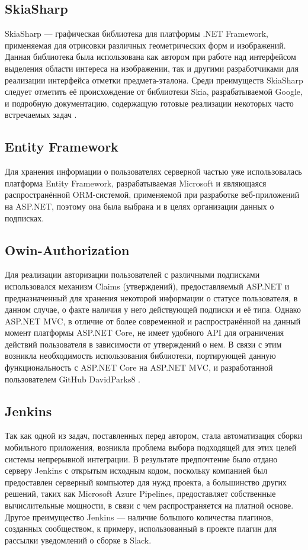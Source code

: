 \documentclass[14pt]{matmex-diploma-custom}
\begin{document}
 \subsection*{SkiaSharp}

SkiaSharp --- графическая библиотека для платформы .NET Framework, применяемая для отрисовки различных геометрических форм и изображений. Данная библиотека была использована как автором при работе над интерфейсом выделения области интереса на изображении, так и другими разработчиками для реализации интерфейса отметки предмета-эталона. Среди преимуществ SkiaSharp следует отметить её происхождение от библиотеки Skia, разрабатываемой Google, и подробную документацию, содержащую готовые реализации некоторых часто встречаемых задач \cite{skia}.

\subsection*{Entity Framework}

Для хранения информации о пользователях серверной частью уже использовалась платформа Entity Framework, разрабатываемая Microsoft и являющаяся распространённой ORM-системой, применяемой при разработке веб-приложений на ASP.NET, поэтому она была выбрана и в целях организации данных о подписках. 

\subsection*{Owin-Authorization}

Для реализации авторизации пользователей с различными подписками использовался механизм Claims (утверждений), предоставляемый ASP.NET и предназначенный для хранения некоторой информации о статусе пользователя, в данном случае, о факте наличия у него действующей подписки и её типа. Однако ASP.NET MVC, в отличие от более современной и распространённой на данный момент платформы ASP.NET Core, не имеет удобного API для ограничения действий пользователя в зависимости от утверждений о нем. В связи с этим возникла необходимость использования библиотеки, портирующей данную функциональность с ASP.NET Core на ASP.NET MVC, и разработанной пользователем GitHub DavidParks8 \cite{auth}.

\subsection*{Jenkins}

Так как одной из задач, поставленных перед автором, стала автоматизация сборки мобильного приложения, возникла проблема выбора подходящей для этих целей системы непрерывной интеграции. В результате предпочтение было отдано серверу Jenkins с открытым исходным кодом, поскольку компанией был предоставлен серверный компьютер для нужд проекта, а большинство других решений, таких как Microsoft Azure Pipelines, предоставляет собственные вычислительные мощности, в связи с чем распространяется на платной основе. Другое преимущество Jenkins --- наличие большого количества плагинов, созданных сообществом, к примеру, использованный в проекте плагин для рассылки уведомлений о сборке в Slack.
\end{document}
